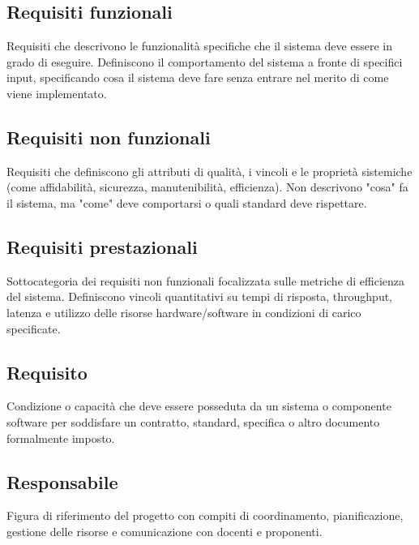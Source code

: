 \documentclass[a4paper,11pt]{article}
\begin{document}
\subsection{Requisiti funzionali}
Requisiti che descrivono le funzionalità specifiche che il sistema deve essere in grado di eseguire. Definiscono il comportamento del sistema a fronte di specifici input, specificando cosa il sistema deve fare senza entrare nel merito di come viene implementato.







\subsection{Requisiti non funzionali}
Requisiti che definiscono gli attributi di qualità, i vincoli e le proprietà sistemiche (come affidabilità, sicurezza, manutenibilità, efficienza). Non descrivono "cosa" fa il sistema, ma "come" deve comportarsi o quali standard deve rispettare.







\subsection{Requisiti prestazionali}
Sottocategoria dei requisiti non funzionali focalizzata sulle metriche di efficienza del sistema. Definiscono vincoli quantitativi su tempi di risposta, throughput, latenza e utilizzo delle risorse hardware/software in condizioni di carico specificate.







\subsection{Requisito}
Condizione o capacità che deve essere posseduta da un sistema o componente software per soddisfare un contratto, standard, specifica o altro documento formalmente imposto.









\subsection{Responsabile}
Figura di riferimento del progetto con compiti di coordinamento, pianificazione, gestione delle risorse e comunicazione con docenti e proponenti.
\end{document}
